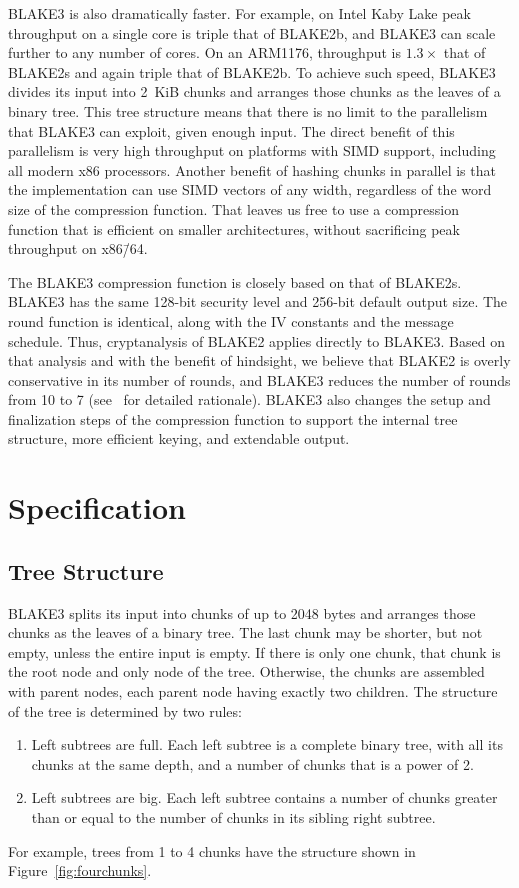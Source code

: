 \documentclass[12pt,notitlepage,a4paper]{article}
\begin{document}
BLAKE3 is also dramatically faster.
For example, on Intel Kaby Lake peak throughput on a single core is triple
that of BLAKE2b, and BLAKE3 can scale further to any number of cores. On an
ARM1176, throughput is $1.3\times$ that of BLAKE2s and again triple that of
BLAKE2b.
To achieve such speed, BLAKE3 divides its input into 2~KiB chunks and
arranges those chunks as the leaves of a binary tree. 
This tree structure means that there is no limit to the parallelism that
BLAKE3 can exploit, given enough input. 
The direct benefit of this parallelism is very high throughput on
platforms with SIMD support, including all modern x86 processors.
Another benefit of hashing chunks in parallel is that the implementation
can use SIMD vectors of any width, regardless of the word size of the
compression function. 
That leaves us free to use a compression function that is efficient on
smaller architectures, without sacrificing peak throughput on x86\=/64.

The BLAKE3 compression function is closely based on that of BLAKE2s.
BLAKE3 has the same 128-bit security level and 256-bit default output
size. The round function is identical, along with the IV constants and
the message schedule. Thus, cryptanalysis of BLAKE2 applies directly to
BLAKE3. Based on that analysis and with the benefit of hindsight, we
believe that BLAKE2 is overly conservative in its number of rounds, and
BLAKE3 reduces the number of rounds from 10 to 7 (see~\cite{TMC} for
detailed rationale).
BLAKE3 also changes the setup and finalization steps of the compression
function to support the internal tree structure, more efficient keying,
and extendable output.

\section{Specification}\label{sec:specification}

\subsection{Tree Structure}\label{sec:tree}

BLAKE3 splits its input into chunks of up to 2048 bytes and arranges those
chunks as the leaves of a binary tree. The last chunk may be shorter, but not
empty, unless the entire input is empty. If there is only one chunk, that chunk
is the root node and only node of the tree. Otherwise, the chunks are assembled
with parent nodes, each parent node having exactly two children. The
structure of the tree is determined by two rules:
\begin{enumerate}
    \item Left subtrees are full. Each left subtree is a complete binary tree,
        with all its chunks at the same depth, and a number of chunks that is a
        power of 2.
    \item Left subtrees are big. Each left subtree contains a number of chunks
        greater than or equal to the number of chunks in its sibling right
        subtree.
\end{enumerate}
For example, trees from 1 to 4 chunks have the structure shown in
Figure~\ref{fig:fourchunks}.
\end{document}
